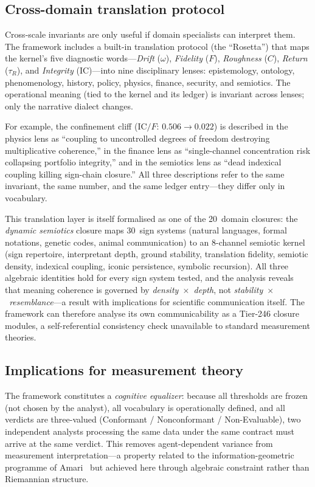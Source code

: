 \documentclass[
  aps,
  prx,
  twocolumn,
  superscriptaddress,
  nofootinbib,
  floatfix
]{revtex4-2}
\newcommand{\tR}{\tau_{\!R}}
\newcommand{\IC}{\mathrm{IC}}
\begin{document}
\subsection{Cross-domain translation protocol}

Cross-scale invariants are only useful if domain specialists
can interpret them. The framework includes a built-in translation
protocol (the ``Rosetta'') that maps the kernel's five diagnostic
words---\emph{Drift} ($\omega$), \emph{Fidelity} ($F$),
\emph{Roughness} ($C$), \emph{Return} ($\tR$), and
\emph{Integrity} ($\IC$)---into nine disciplinary lenses:
epistemology, ontology, phenomenology, history, policy, physics,
finance, security, and semiotics. The operational meaning (tied
to the kernel and its ledger) is invariant across lenses; only
the narrative dialect changes.

For example, the confinement cliff ($\IC/F$: $0.506 \to 0.022$)
is described in the physics lens as ``coupling to uncontrolled
degrees of freedom destroying multiplicative coherence,'' in the
finance lens as ``single-channel concentration risk collapsing
portfolio integrity,'' and in the semiotics lens as ``dead
indexical coupling killing sign-chain closure.'' All three
descriptions refer to the same invariant, the same number, and
the same ledger entry---they differ only in vocabulary.

This translation layer is itself formalised as one of the
20~domain closures: the \emph{dynamic semiotics} closure maps
30~sign systems (natural languages, formal notations, genetic
codes, animal communication) to an 8-channel semiotic kernel
(sign repertoire, interpretant depth, ground stability,
translation fidelity, semiotic density, indexical coupling,
iconic persistence, symbolic recursion). All three algebraic
identities hold for every sign system tested, and the analysis
reveals that meaning coherence is governed by
\emph{density~$\times$~depth}, not
\emph{stability~$\times$~resemblance}---a result
with implications for scientific communication itself. The
framework can therefore analyse its own communicability as a
Tier-246 closure modules, a self-referential consistency check unavailable
to standard measurement theories.

\subsection{Implications for measurement theory}

The framework constitutes a \emph{cognitive equalizer}: because all
thresholds are frozen (not chosen by the analyst), all vocabulary is
operationally defined, and all verdicts are three-valued
(Conformant / Nonconformant / Non-Evaluable), two independent
analysts processing the same data under the same contract must
arrive at the same verdict. This removes agent-dependent variance
from measurement interpretation---a property related to the
information-geometric programme of Amari~\cite{amari2016information}
but achieved here through algebraic constraint rather than
Riemannian structure.
\end{document}
